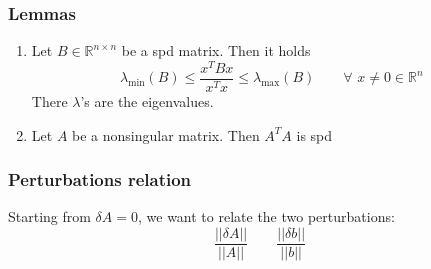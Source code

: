 \subsubsection{Lemmas}
\begin{enumerate}[1)]
    \item Let $B\in\mathbb{R}^{n\times n}$ be a spd matrix. Then it holds
    $$
    \lambda_{\min}(B)\leq\frac{x^TBx}{x^Tx}\leq\lambda_{\max}(B)\qquad\forall\,\,x\neq 0\in\mathbb{R}^n
    $$
    There $\lambda$'s are the eigenvalues.
    \item Let $A$ be a nonsingular matrix. Then $A^TA$ is spd
\end{enumerate}

\subsubsection{Perturbations relation}
Starting from $\delta A=0$, we want to relate the two perturbations:
$$\frac{||\delta A||}{||A||}\qquad\frac{||\delta b||}{||b||}$$
